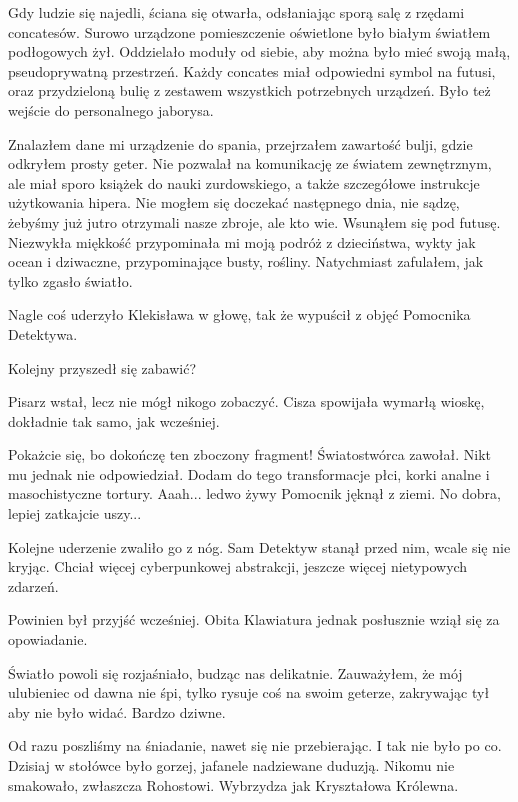 Gdy ludzie się najedli, ściana się otwarła, odsłaniając sporą salę z rzędami concatesów.
Surowo urządzone pomieszczenie oświetlone było białym światłem podłogowych żył.
Oddzielało moduły od siebie, aby można było mieć swoją małą, pseudoprywatną przestrzeń.
Każdy concates miał odpowiedni symbol na futusi, oraz przydzieloną bulię z zestawem wszystkich potrzebnych urządzeń.
Było też wejście do personalnego jaborysa.

Znalazłem dane mi urządzenie do spania, przejrzałem zawartość bulji, gdzie odkryłem prosty geter.
Nie pozwalał na komunikację ze światem zewnętrznym, ale miał sporo książek do nauki zurdowskiego, a także szczegółowe instrukcje użytkowania hipera.
Nie mogłem się doczekać następnego dnia, nie sądzę, żebyśmy już jutro otrzymali nasze zbroje, ale kto wie.
Wsunąłem się pod futusę.
Niezwykła miękkość przypominała mi moją podróż z dzieciństwa, wykty jak ocean i dziwaczne, przypominające busty, rośliny.
Natychmiast zafulałem, jak tylko zgasło światło.

\divider{}

Nagle coś uderzyło Klekisława w głowę, tak że wypuścił z objęć Pomocnika Detektywa.

Kolejny przyszedł się zabawić?

Pisarz wstał, lecz nie mógł nikogo zobaczyć.
Cisza spowijała wymarłą wioskę, dokładnie tak samo, jak wcześniej.

\begin{dialogue}
\ds{} Pokażcie się, bo dokończę ten zboczony fragment! \dm{} Światostwórca zawołał. Nikt mu jednak nie odpowiedział. \dm{} Dodam do tego transformacje płci, korki analne i masochistyczne tortury.
\ds{} Aaah... \dm{} ledwo żywy Pomocnik jęknął z ziemi.
\ds{} No dobra, lepiej zatkajcie uszy...
\end{dialogue}

Kolejne uderzenie zwaliło go z nóg. 
Sam Detektyw stanął przed nim, wcale się nie kryjąc.
Chciał więcej cyberpunkowej abstrakcji, jeszcze więcej nietypowych zdarzeń.

Powinien był przyjść wcześniej.
Obita Klawiatura jednak posłusznie wziął się za opowiadanie.

\divider{}

Światło powoli się rozjaśniało, budząc nas delikatnie.
Zauważyłem, że mój ulubieniec od dawna nie śpi, tylko rysuje coś na swoim geterze, zakrywając tył aby nie było widać.
Bardzo dziwne.

Od razu poszliśmy na śniadanie, nawet się nie przebierając. I tak nie było po co.
Dzisiaj w stołówce było gorzej, jafanele nadziewane duduzją.
Nikomu nie smakowało, zwłaszcza Rohostowi. Wybrzydza jak Kryształowa Królewna.

